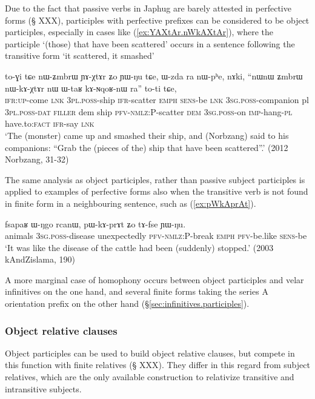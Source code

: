 Due to the fact that passive verbs in Japhug are barely attested in perfective forms (§ XXX), participles with perfective prefixes can be considered to be object participles, especially in cases like (\ref{ex:YAXtAr.nWkAXtAr}), where the participle   `(those) that have been scattered' occurs in a sentence following the transitive form  `it scattered, it smashed'

\begin{exe}
\ex \label{ex:YAXtAr.nWkAXtAr}
 \gll    to-ɣi tɕe nɯ-ʑmbrɯ ɲɤ-χtɤr ʑo ɲɯ-ŋu tɕe, ɯ-zda ra nɯ-pʰe, nɤki,  ``nɯnɯ ʑmbrɯ nɯ-kɤ-χtɤr nɯ ɯ-taʁ kɤ-ɴqoʁ-nɯ ra'' to-ti tɕe,  \\
 \textsc{ifr}:\textsc{up}-come \textsc{lnk} \textsc{3pl}.\textsc{poss}-ship \textsc{ifr}-scatter \textsc{emph} \textsc{sens}-be \textsc{lnk} \textsc{3sg}.\textsc{poss}-companion pl \textsc{3pl}.\textsc{poss}-\textsc{dat} \textsc{filler} dem ship \textsc{pfv}-\textsc{nmlz}:P-scatter \textsc{dem} \textsc{3sg}.\textsc{poss}-on \textsc{imp}-hang-\textsc{pl} have.to:\textsc{fact} \textsc{ifr}-say \textsc{lnk} \\
 \glt `The (monster) came up and smashed their ship, and (Norbzang) said to his companions: ``Grab the (pieces of the) ship that have been scattered''.' (2012 Norbzang, 31-32)
\end{exe}

The same analysis as object participles, rather than passive subject participles is applied to examples of perfective  forms also when the transitive verb is not found in finite form in a neighbouring sentence, such as (\ref{ex:pWkAprAt}).

\begin{exe}
\ex \label{ex:pWkAprAt}
 \gll fsapaʁ ɯ-ŋgo rcanɯ, pɯ-kɤ-prɤt ʑo tɤ-fse ɲɯ-ŋu. \\
 animals \textsc{3sg}.\textsc{poss}-disease unexpectedly \textsc{pfv}-\textsc{nmlz}:P-break \textsc{emph} \textsc{pfv}-be.like \textsc{sens}-be \\
 \glt  `It was like the disease of the cattle had been (suddenly) stopped.' (2003 kAndZislama, 190)
\end{exe}

A more marginal case of homophony occurs between object participles  and velar infinitives on the one hand, and several finite forms taking the series A orientation prefix  on the other hand (§\ref{sec:infinitives.participles}).

\subsubsection{Object relative clauses} \label{sec:object.participle.relatives}
Object participles can be used to build object relative clauses, but compete in this function with finite relatives (§ XXX). They differ in this regard from subject relatives, which are the only available construction to relativize transitive and intransitive subjects.

